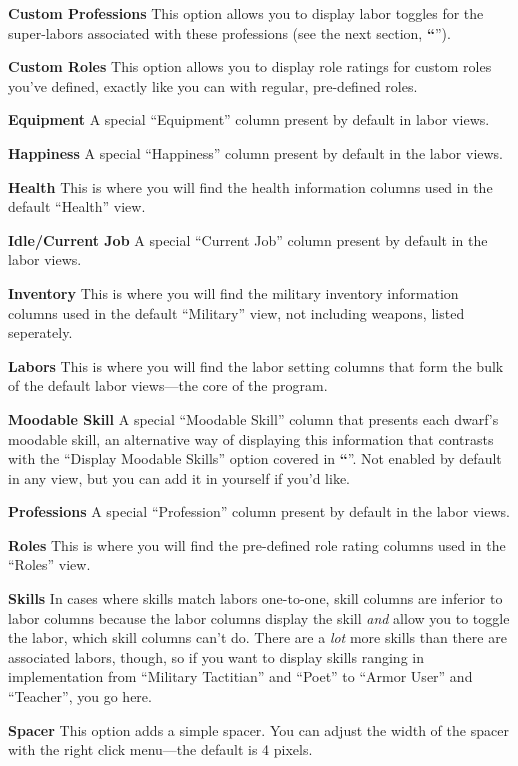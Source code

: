 \documentclass[]{article}
\newcommand{\jump}[1] {\textbf{``\nameref{sec:#1}}''}
\newcommand{\boldlist}[1] {
\vspace{12pt}
\noindent \textbf{#1}
}
\begin{document}
\boldlist{Custom Professions} This option allows you to display labor toggles for the super-labors
associated with these professions (see the next section, \jump{Super Labors}).

\boldlist{Custom Roles} This option allows you to display role ratings for custom roles you've defined,
exactly like you can with regular, pre-defined roles.

\boldlist{Equipment} A special ``Equipment'' column present by default in labor views.

\boldlist{Happiness} A special ``Happiness'' column present by default in the labor views.

\boldlist{Health} This is where you will find the health information columns used in the
default ``Health'' view.

\boldlist{Idle/Current Job} A special ``Current Job'' column present by default in the labor
views.

\boldlist{Inventory} This is where you will find the military inventory information columns used
in the default ``Military'' view, not including weapons, listed seperately.

\boldlist{Labors} This is where you will find the labor setting columns that form the bulk of the default
labor views---the core of the program.

\boldlist{Moodable Skill} A special ``Moodable Skill'' column that presents each dwarf's moodable skill,
an alternative way of displaying this information that contrasts with the ``Display Moodable Skills''
option covered in \jump{Options}. Not enabled by default in any view, but you can add it in yourself if
you'd like.

\boldlist{Professions} A special ``Profession'' column present by default in the labor views.

\boldlist{Roles} This is where you will find the pre-defined role rating columns used in the ``Roles''
view.

\boldlist{Skills} In cases where skills match labors one-to-one, skill columns are inferior to labor
columns because the labor columns display the skill \emph{and} allow you to toggle the labor, which
skill columns can't do. There are a \emph{lot} more skills than there are associated labors, though, so
if you want to display skills ranging in implementation from ``Military Tactitian'' and ``Poet'' to
``Armor User'' and ``Teacher'', you go here.

\boldlist{Spacer} This option adds a simple spacer. You can adjust the width of the spacer with the right
click menu---the default is 4 pixels.
\end{document}
